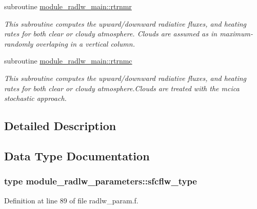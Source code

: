 \begin{DoxyCompactItemize}
\item 
subroutine \hyperlink{group__module__radlw__main_gab0d2454aa5b29643b52fa31abe2f97b0}{module\+\_\+radlw\+\_\+main\+::rtrnmr}
\begin{DoxyCompactList}\small\item\em This subroutine computes the upward/downward radiative fluxes, and heating rates for both clear or cloudy atmosphere. Clouds are assumed as in maximum-\/randomly overlaping in a vertical column. \end{DoxyCompactList}\end{DoxyCompactItemize}
\begin{DoxyCompactItemize}
\item 
subroutine \hyperlink{group__module__radlw__main_gaf0e13eadc5dad88e144734d2c6b9fd0f}{module\+\_\+radlw\+\_\+main\+::rtrnmc}
\begin{DoxyCompactList}\small\item\em This subroutine computes the upward/downward radiative fluxes, and heating rates for both clear or cloudy atmosphere.\+Clouds are treated with the mcica stochastic approach. \end{DoxyCompactList}\end{DoxyCompactItemize}


\subsection{Detailed Description}


\subsection{Data Type Documentation}
\label{structmodule__radlw__parameters_1_1sfcflw__type}
\hypertarget{group__module__radlw__main_structmodule__radlw__parameters_1_1sfcflw__type}{}
\subsubsection{type module\+\_\+radlw\+\_\+parameters\+:\+:sfcflw\+\_\+type}


Definition at line 89 of file radlw\+\_\+param.\+f.



